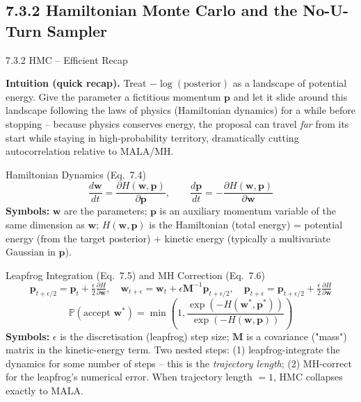 \documentclass[aspectratio=169,10pt]{beamer}
\newcommand{\Prob}{\mathbb{P}}
\newcommand{\bw}{\mathbf{w}}
\newcommand{\bp}{\mathbf{p}}
\begin{document}
\subsection{7.3.2 Hamiltonian Monte Carlo and the No-U-Turn Sampler}

\begin{frame}[allowframebreaks]{7.3.2 HMC -- Efficient Recap}

\textbf{Intuition (quick recap).} Treat $-\log(\text{posterior})$ as a landscape of potential energy. Give the parameter a fictitious momentum $\bp$ and let it slide around this landscape following the laws of physics (Hamiltonian dynamics) for a while before stopping -- because physics conserves energy, the proposal can travel \emph{far} from its start while staying in high-probability territory, dramatically cutting autocorrelation relative to MALA/MH.

\begin{block}{Hamiltonian Dynamics (Eq.~7.4)}
\[
  \frac{d\bw}{dt} = \frac{\partial H(\bw,\bp)}{\partial \bp}, \qquad
  \frac{d\bp}{dt} = -\frac{\partial H(\bw,\bp)}{\partial \bw}
\]
\textbf{Symbols:} $\bw$ are the parameters; $\bp$ is an auxiliary momentum variable of the same dimension as $\bw$; $H(\bw,\bp)$ is the Hamiltonian (total energy) = potential energy (from the target posterior) + kinetic energy (typically a multivariate Gaussian in $\bp$).
\end{block}

\begin{block}{Leapfrog Integration (Eq.~7.5) and MH Correction (Eq.~7.6)}
\[
  \bp_{t+\epsilon/2} = \bp_t + \tfrac{\epsilon}{2}\tfrac{\partial H}{\partial \bw},\quad
  \bw_{t+\epsilon} = \bw_t + \epsilon \mathbf{M}^{-1}\bp_{t+\epsilon/2},\quad
  \bp_{t+\epsilon} = \bp_{t+\epsilon/2} + \tfrac{\epsilon}{2}\tfrac{\partial H}{\partial \bw}
\]
\[
  \Prob(\text{accept } \bw^*) = \min\!\left(1, \frac{\exp(-H(\bw^*,\bp^*))}{\exp(-H(\bw,\bp))}\right)
\]
\textbf{Symbols:} $\epsilon$ is the discretisation (leapfrog) step size; $\mathbf{M}$ is a covariance ("mass") matrix in the kinetic-energy term. Two nested steps: (1) leapfrog-integrate the dynamics for some number of steps -- this is the \emph{trajectory length}; (2) MH-correct for the leapfrog's numerical error. When trajectory length $=1$, HMC collapses exactly to MALA.
\end{block}


\end{frame}
\end{document}

